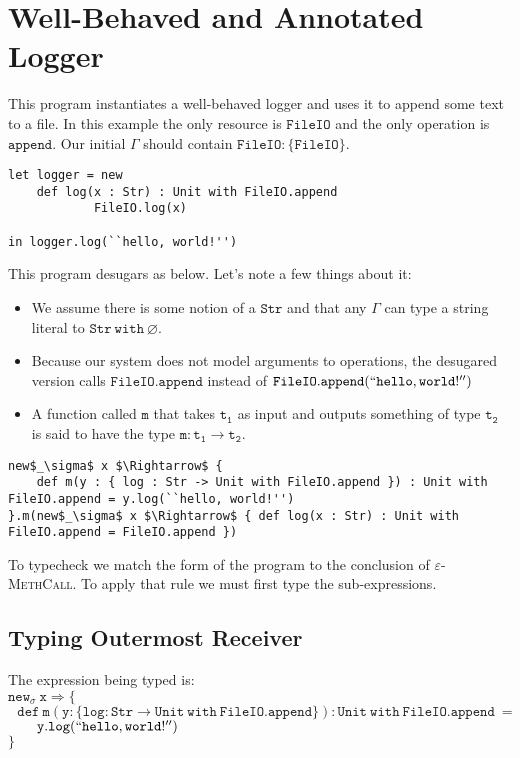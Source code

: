 \documentclass{llncs}
\newcommand{\kwa}[1]{\mathtt{#1}}
\begin{document}
\section{Well-Behaved and Annotated Logger}

This program instantiates a well-behaved logger and uses it to append some text to a file. In this example the only resource is $\kwa{FileIO}$ and the only operation is $\kwa{append}$. Our initial $\kwa{\Gamma}$ should contain $\kwa{FileIO : \{ FileIO \}}$.

\begin{lstlisting}
let logger = new
	def log(x : Str) : Unit with FileIO.append
			FileIO.log(x)
	
in logger.log(``hello, world!'')
\end{lstlisting}

\noindent
This program desugars as below. Let's note a few things about it:
	\begin{itemize}
		\item We assume there is some notion of a $\kwa{Str}$ and that any $\Gamma$ can type a string literal to $\kwa{Str~with~\varnothing}$.
		\item Because our system does not model arguments to operations, the desugared version calls $\kwa{FileIO.append}$ instead of $\kwa{FileIO.append(``hello, world!'')}$
		\item A function called $\kwa{m}$ that takes $\kwa{t_1}$ as input and outputs something of type $\kwa{t_2}$ is said to have the type $\kwa{m : t_1 \rightarrow t_2}$.
	\end{itemize}

\begin{lstlisting}
new$_\sigma$ x $\Rightarrow$ {
	def m(y : { log : Str -> Unit with FileIO.append }) : Unit with FileIO.append = y.log(``hello, world!'')
}.m(new$_\sigma$ x $\Rightarrow$ { def log(x : Str) : Unit with FileIO.append = FileIO.append })

\end{lstlisting}

\noindent
To typecheck we match the form of the program to the conclusion of \textsc{$\varepsilon$-MethCall}. To apply that rule we must first type the sub-expressions. 


\noindent
\subsection*{Typing Outermost Receiver}

\noindent
The expression being typed is: \\
$\kwa{new_\sigma~x \Rightarrow \{}$ \\
$\kwa{~~~def~m(y : \{ log : Str \rightarrow Unit~with~FileIO.append \}) : Unit ~with~FileIO.append~=}$\\
$\kwa{~~~~~~y.log(``hello, world!'')}$\\
$\kwa{ \} }$\\
\end{document}
